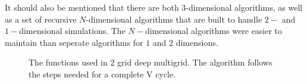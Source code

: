 	It should also be mentioned that there are both \(3\)-dimensional algorithms, as well as a set of recursive \(N\)-dimensional algorithms
	that are built to handle \(2-\) and \(1-\)dimensional simulations. The \(N-\)dimensional algorithms were easier to maintain than seperate algorithms
	for \(1\) and \(2\) dimensions.

	\begin{figure} %
		\centering
		
		\caption{The functions used in \(2\) grid deep multigrid. The algorithm follows the steps needed for a complete V cycle.}
		\label{fig:V_c}
	\end{figure}


